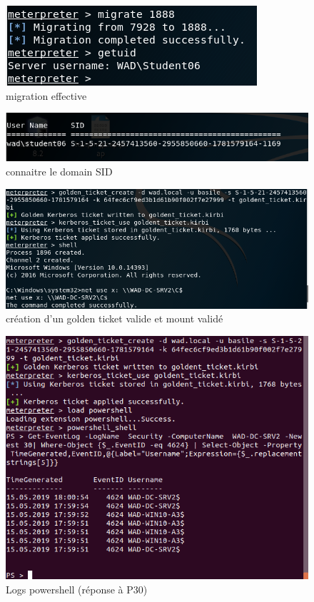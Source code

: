 \documentclass[12pt]{report} %
\begin{document}
\begin{figure}[!h]
	\includegraphics[]{3_6_migrate.PNG}
	\caption*{migration effective}
\end{figure}

\begin{figure}[!h]
	\includegraphics[]{3_6_domain_SID.PNG}
	\caption*{connaitre le domain SID}
\end{figure}

\begin{figure}[!h]
	\includegraphics[width=17cm]{3_6_golden_ticket_works.PNG}
	\caption*{création d'un golden ticket valide et mount validé}
\end{figure}

\begin{figure}[!h]
	\includegraphics[width=17cm]{p30_logs_powershell.PNG}
	\caption*{Logs powershell (réponse à P30)}
\end{figure}
\end{document}
